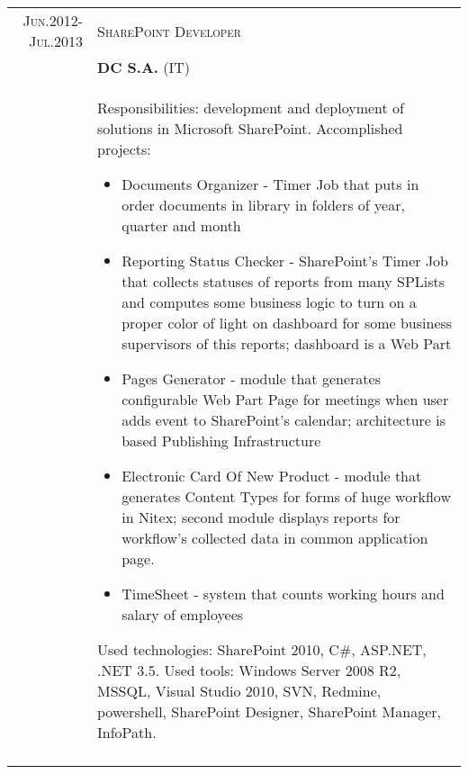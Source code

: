 \documentclass[a4paper,12pt]{article}
\begin{document}
\begin{tabular}{r|p{12cm}}
	\textsc{Jun.2012-Jul.2013}
	&\textsc{SharePoint Developer} \\
	&\textsc{\textbf{DC S.A.}} (IT) \\
	&\footnotesize{
		Responsibilities: development and deployment of solutions in Microsoft SharePoint. \newline
		Accomplished projects:
		\begin{itemize}
			\item Documents Organizer - Timer Job that puts in order documents in library in folders of year, quarter and month
			\item Reporting Status Checker - SharePoint's Timer Job that collects statuses of reports from many SPLists and computes some business logic to
												turn
                                             on a proper color of light on dashboard for some business supervisors of this reports; dashboard is a Web Part
			\item Pages Generator - module that generates configurable Web Part Page for meetings when user adds event to SharePoint's calendar;
			architecture is based Publishing Infrastructure
			\item Electronic Card Of New Product - module that generates Content Types for forms of huge workflow in Nitex; second module displays reports
			for workflow's collected data in common application page.
			\item TimeSheet - system that counts working hours and salary of employees
		\end{itemize}
		Used technologies: SharePoint 2010, C\#, ASP.NET, .NET 3.5. Used tools: Windows Server 2008 R2, MSSQL, Visual Studio 2010,
		SVN, Redmine, powershell, SharePoint Designer, SharePoint Manager, InfoPath.
	}\\
	\multicolumn{2}{c}{}\\
\end{tabular}
\end{document}
